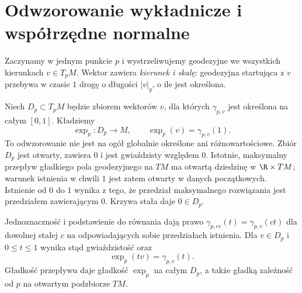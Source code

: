 \section{Odwzorowanie wykładnicze i współrzędne normalne}
\label{sec:exp-normalne}

Zaczynamy w jednym punkcie $p$ i wystrzeliwujemy
geodezyjne we wszystkich kierunkach $v\in T_pM$.
Wektor zawiera \emph{kierunek i skalę}: geodezyjna
startująca z $v$ przebywa w czasie $1$ drogę
o długości $|v|_g$, o ile jest określona.

\begin{definicja}
\label{def:exp-geodezyjna}
Niech $D_p\subset T_pM$ będzie zbiorem wektorów
$v$, dla których $\gamma_{p,v}$ jest określona
na całym $[0,1]$. Kładziemy
\begin{equation}\label{eq:exp-definicja}
 \exp_p:D_p\longrightarrow M,
 \qquad \exp_p(v)=\gamma_{p,v}(1).
\end{equation}
To odwzorowanie nie jest na ogół globalnie
określone ani różnowartościowe. Zbiór $D_p$ jest otwarty,
zawiera $0$ i jest gwiaździsty względem $0$. Istotnie,
maksymalny przepływ gładkiego pola geodezyjnego na $TM$
ma otwartą dziedzinę w $\R\times TM$; warunek istnienia
w chwili $1$ jest zatem otwarty w danych początkowych.
Istnienie od $0$ do $1$ wynika z tego, że przedział
maksymalnego rozwiązania jest przedziałem zawierającym $0$.
Krzywa stała daje $0\in D_p$.

Jednoznaczność i podstawienie do równania dają prawo
$\gamma_{p,cv}(t)=\gamma_{p,v}(ct)$ dla dowolnej stałej $c$
na odpowiadających sobie przedziałach istnienia.
Dla $v\in D_p$ i $0\leq t\leq1$ wynika stąd
gwiaździstość oraz
\begin{equation}\label{eq:exp-skalowanie}
 \exp_p(tv)=\gamma_{p,v}(t).
\end{equation}
Gładkość przepływu daje gładkość $\exp_p$ na całym $D_p$,
a także gładką zależność od $p$ na otwartym podzbiorze $TM$.
\end{definicja}

